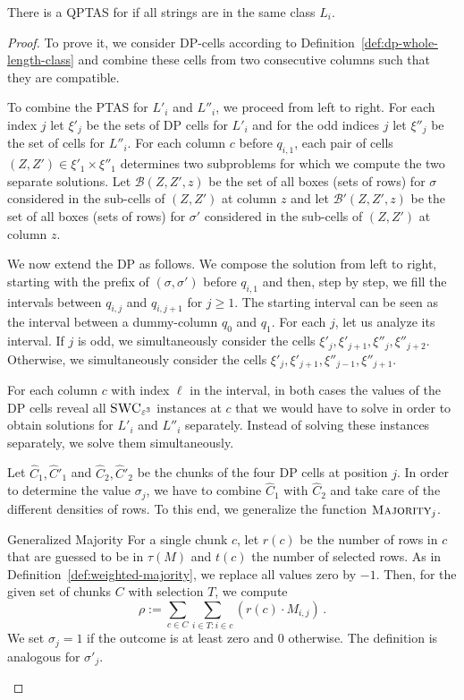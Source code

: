 \begin{lemma}\label{lem:length-class}
    There is a QPTAS for \GMEC if all strings are in the same class $L_i$.
\end{lemma}
\begin{proof}
To prove it, we consider DP-cells according to Definition~\ref{def:dp-whole-length-class} and combine these cells from two consecutive columns such that they are compatible.

    To combine the PTAS for $L'_i$ and $L''_i$, we proceed from left to right.
    For each index $j$ let $\xi'_j$ be the sets of DP cells for $L'_i$ and for the odd indices $j$ let $\xi''_j$ be the set of cells for $L''_i$.
    For each column $c$ before $q_{i,1}$, each pair of cells $(Z,Z') \in \xi'_1 \times \xi''_1$ determines two subproblems for which we compute the two separate solutions.
    Let $\mathcal{B}(Z,Z',z)$ be the set of all boxes (sets of rows) for $\sigma$ considered in the sub-cells of $(Z,Z')$ at column $z$ and
    let $\mathcal{B}'(Z,Z',z)$ be the set of all boxes (sets of rows) for $\sigma'$ considered in the sub-cells of $(Z,Z')$ at column $z$. 

    We now extend the DP as follows.
    We compose the solution from left to right, starting with the prefix of $(\sigma,\sigma')$ before $q_{i,1}$ and then, step by step, we fill the intervals between $q_{i,j}$ and $q_{i,j+1}$ for $j \ge 1$.
    The starting interval can be seen as the interval between a dummy-column $q_0$ and $q_1$.
    For each $j$, let us analyze its interval. 
    If $j$ is odd, we simultaneously consider the cells $\xi'_j,\xi'_{j+1},\xi''_j, \xi''_{j+2}$.
    Otherwise, we simultaneously consider the cells $\xi'_j,\xi'_{j+1},\xi''_{j-1}, \xi''_{j+1}$.

    For each column $c$ with index $\ell$ in the interval, in both cases the values of the DP cells reveal all $\textsc{SWC}_{\varepsilon^3}$ instances at $c$ that we would have to solve in order to obtain solutions for $L'_i$ and $L''_i$ separately.
    Instead of solving these instances separately, we solve them simultaneously.

    Let $\hat{C}_1, \hat{C}'_1$ and $\hat{C}_2,\hat{C}'_2$ be the chunks of the four DP cells at position $j$.
    In order to determine the value $\sigma_j$, we have to combine $\hat{C}_1$ with $\hat{C}_2$ and take care of the different densities of rows.
    To this end, we generalize the function $\textsc{Majority}_j$.
    \begin{definition}{Generalized Majority}
        \label{def:generalized-majority}
        For a single chunk $c$, let $r(c)$ be the number of rows in $c$ that are guessed to be in $\tau(M)$ and $t(c)$ the number of selected rows.
        As in Definition~\ref{def:weighted-majority}, we replace all values zero by $-1$.
        Then, for the given set of chunks $C$ with selection $T$, we compute 
        \[
            \rho := \sum_{c \in C} \sum_{i \in T\colon i \in c} (r(c) \cdot M_{i,j})\,.
        \]
        We set $\sigma_j = 1$ if the outcome is at least zero and $0$ otherwise.    
        The definition is analogous for $\sigma'_j$.
    \end{definition}


\end{proof}
